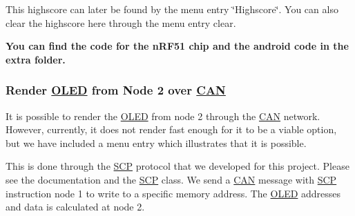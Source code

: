 This highscore can later be found by the menu entry \char`\"{}\+Highscore\char`\"{}. You can also clear the highscore here through the menu entry clear.

{\bfseries You can find the code for the n\+R\+F51 chip and the android code in the extra folder.}

\subsubsection*{Render \hyperlink{class_o_l_e_d}{O\+L\+ED} from Node 2 over \hyperlink{class_c_a_n}{C\+AN}}

It is possible to render the \hyperlink{class_o_l_e_d}{O\+L\+ED} from node 2 through the \hyperlink{class_c_a_n}{C\+AN} network. However, currently, it does not render fast enough for it to be a viable option, but we have included a menu entry which illustrates that it is possible.

This is done through the \hyperlink{class_s_c_p}{S\+CP} protocol that we developed for this project. Please see the documentation and the \hyperlink{class_s_c_p}{S\+CP} class. We send a \hyperlink{class_c_a_n}{C\+AN} message with \hyperlink{class_s_c_p}{S\+CP} instruction node 1 to write to a specific memory address. The \hyperlink{class_o_l_e_d}{O\+L\+ED} addresses and data is calculated at node 2. 